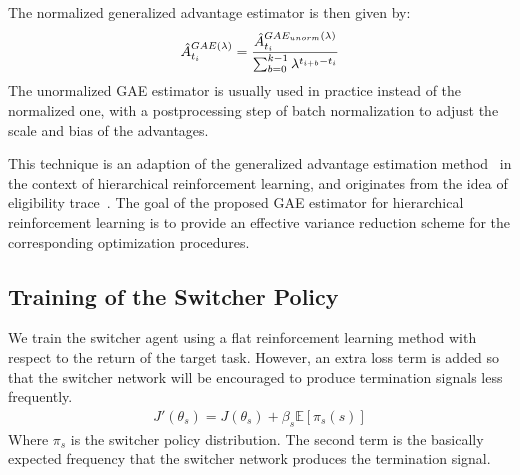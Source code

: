 The normalized generalized advantage estimator is then given by:
\begin{align}
\hat{A}_{t_i}^{GAE(\lambda)}
= \frac{\hat{A}_{t_i}^{GAE_{unorm}(\lambda)}}{\sum_{b=0}^{k-1} \lambda^{t_{i+b}-t_i}}
\end{align}
The unormalized GAE estimator is usually used in practice instead of the normalized one, with a postprocessing step of batch normalization to adjust the scale and bias of the advantages.

This technique is an adaption of the generalized advantage estimation method~\cite{schulman2015high} in the context of hierarchical reinforcement learning, and originates from the idea of eligibility trace~\cite{rlintro_sutton1998reinforcement}. The goal of the proposed GAE estimator for hierarchical reinforcement learning is to provide an effective variance reduction scheme for the corresponding optimization procedures.

\subsection{Training of the Switcher Policy}
We train the switcher agent using a flat reinforcement learning method with respect to the return of the target task. However, an extra loss term is added so that the switcher network will be encouraged to produce termination signals less frequently.
\begin{align}
J'(\theta_s) = J(\theta_s) + \beta_s\mathbb{E}[\pi_s(s)]
\end{align}
Where $\pi_s$ is the switcher policy distribution. The second term is the basically expected frequency that the switcher network produces the termination signal.

